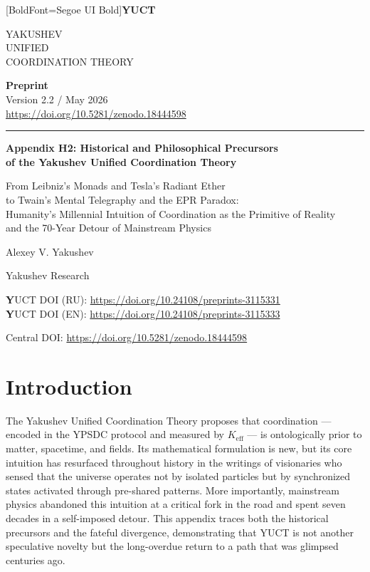 \documentclass[12pt,a4paper]{article}
\newcommand{\makeheader}{%
	\noindent
	\begin{minipage}{0.17\textwidth}
		\raggedright
		{\fontspec{Segoe UI}[BoldFont=Segoe UI Bold]\bfseries\color{skyblue}\fontsize{46}{46}\selectfont YUCT}%
	\end{minipage}%
	\hspace{30pt}
	\begin{minipage}{0.32\textwidth}
		\raggedright
		{\sffamily\fontsize{11}{13}\selectfont YAKUSHEV\\ UNIFIED\\ COORDINATION THEORY}%
	\end{minipage}%
	\hfill
	\begin{minipage}{0.38\textwidth}
		\raggedleft
		{\sffamily\bfseries Preprint}\\ 
		{\sffamily Version 2.2 / May 2026}\\ 
		{\sffamily\footnotesize \url{https://doi.org/10.5281/zenodo.18444598}}%
	\end{minipage}
	\par\vspace{5pt}
	\noindent\textcolor{gold}{\rule{\textwidth}{1.6pt}}
	\par\vspace{0pt}
}
\begin{document}
	
\makeheader
\thispagestyle{firstpage}
	\vspace*{1cm}
	
	\begin{center}
		{\fontsize{28}{32}\selectfont\bfseries\color{darkblue} Appendix H2: Historical and Philosophical Precursors\\
			of the Yakushev Unified Coordination Theory}
		
		\vspace{1cm}
		\large
		From Leibniz's Monads and Tesla's Radiant Ether\\
		to Twain's Mental Telegraphy and the EPR Paradox:\\
		Humanity's Millennial Intuition of Coordination as the Primitive of Reality\\
		and the 70-Year Detour of Mainstream Physics
	\end{center}
	
	
		\vspace{8cm}
	{\large Alexey V. Yakushev\par}
	\vspace{0.3cm}
	{\normalsize Yakushev Research\par}
	
	
	\vspace{2cm}
	\large 
	\textbf YUCT DOI (RU): \url{https://doi.org/10.24108/preprints-3115331} \\
	\textbf YUCT DOI (EN): \url{https://doi.org/10.24108/preprints-3115333}
	

	
	\vspace{1cm}
	\small
	Central DOI: \url{https://doi.org/10.5281/zenodo.18444598} \\
	

\newpage	
	\section{Introduction}
	
	The Yakushev Unified Coordination Theory proposes that coordination --- encoded in the YPSDC protocol and measured by \(K_{\mathrm{eff}}\) --- is ontologically prior to matter, spacetime, and fields. Its mathematical formulation is new, but its core intuition has resurfaced throughout history in the writings of visionaries who sensed that the universe operates not by isolated particles but by synchronized states activated through pre-shared patterns. More importantly, mainstream physics abandoned this intuition at a critical fork in the road and spent seven decades in a self-imposed detour. This appendix traces both the historical precursors and the fateful divergence, demonstrating that YUCT is not another speculative novelty but the long-overdue return to a path that was glimpsed centuries ago.
	
\end{document}

